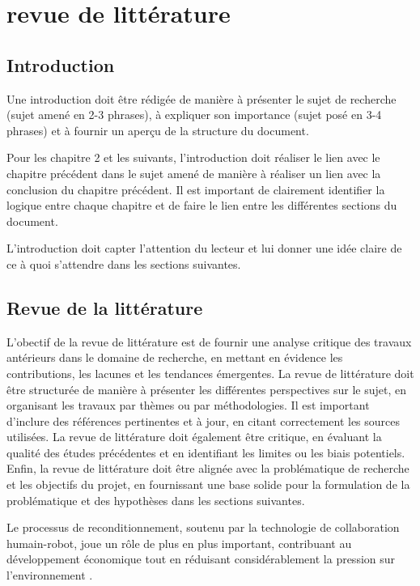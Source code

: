 \chapter{revue de littérature}
\label{chap:chap_2}
\section*{Introduction}
Une introduction doit être rédigée de manière à présenter le sujet de recherche (sujet amené en 2-3 phrases), à expliquer son importance (sujet posé en 3-4 phrases) et à fournir un aperçu de la structure du document. 

Pour les chapitre 2 et les suivants, l'introduction doit réaliser le lien avec le chapitre précédent dans le sujet amené de manière à réaliser un lien avec la conclusion du chapitre précédent. Il est important de clairement identifier la logique entre chaque chapitre et de faire le lien entre les différentes sections du document.

L'introduction doit capter l'attention du lecteur et lui donner une idée claire de ce à quoi s'attendre dans les sections suivantes.

\section{Revue de la littérature}

L'obectif de la revue de littérature est de fournir une analyse critique des travaux antérieurs dans le domaine de recherche, en mettant en évidence les contributions, les lacunes et les tendances émergentes. La revue de littérature doit être structurée de manière à présenter les différentes perspectives sur le sujet, en organisant les travaux par thèmes ou par méthodologies. Il est important d'inclure des références pertinentes et à jour, en citant correctement les sources utilisées. La revue de littérature doit également être critique, en évaluant la qualité des études précédentes et en identifiant les limites ou les biais potentiels. Enfin, la revue de littérature doit être alignée avec la problématique de recherche et les objectifs du projet, en fournissant une base solide pour la formulation de la problématique et des hypothèses dans les sections suivantes.

Le processus de reconditionnement, soutenu par la technologie de collaboration humain-robot, joue un rôle de plus en plus important, contribuant au développement économique tout en réduisant considérablement la pression sur l'environnement \cite{wu2024}.

